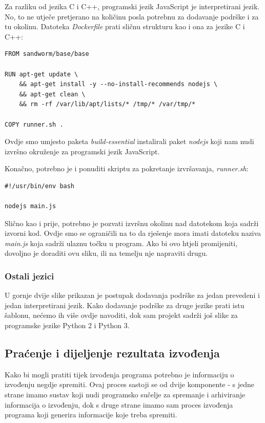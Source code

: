 \documentclass[times, utf8, zavrsni]{fer}
\begin{document}
Za razliku od jezika C i C++, programski jezik JavaScript je interpretirani jezik. No, to ne utječe pretjerano na količinu posla potrebnu za dodavanje podrške i za tu okolinu. Datoteka {\textit{Dockerfile}} prati sličnu strukturu kao i ona za jezike C i C++:

\begin{lstlisting}
FROM sandworm/base/base

RUN apt-get update \
    && apt-get install -y --no-install-recommends nodejs \
    && apt-get clean \
    && rm -rf /var/lib/apt/lists/* /tmp/* /var/tmp/*

COPY runner.sh .
\end{lstlisting}

Ovdje smo umjesto paketa {\textit{build-essential}} instalirali paket {\textit{nodejs}} koji nam nudi izvršno okruženje za programski jezik JavaScript.

Konačno, potrebno je i ponuditi skriptu za pokretanje izvršavanja, {\textit{runner.sh}}:

\begin{lstlisting}
#!/usr/bin/env bash

nodejs main.js
\end{lstlisting}

Slično kao i prije, potrebno je pozvati izvršnu okolinu nad datotekom koja sadrži izvorni kod. Ovdje smo se ograničili na to da rješenje mora imati datoteku naziva {\textit{main.js}} koja sadrži ulaznu točku u program. Ako bi ovo htjeli promijeniti, dovoljno je doraditi ovu sliku, ili na temelju nje napraviti drugu.

\subsubsection{Ostali jezici}

U gornje dvije slike prikazan je postupak dodavanja podrške za jedan prevedeni i jedan interpretirani jezik. Kako dodavanje podrške za druge jezike prati istu šablonu, nećemo ih više ovdje navoditi, dok sam projekt sadrži još slike za programske jezike Python 2 i Python 3.

\subsection{Praćenje i dijeljenje rezultata izvođenja}

Kako bi mogli pratiti tijek izvođenja programa potrebno je informaciju o izvođenju negdje spremiti. Ovaj proces sastoji se od dvije komponente - s jedne strane imamo sustav koji nudi programsko sučelje za spremanje i arhiviranje informacija o izvođenju, dok s druge strane imamo sam proces izvođenja programa koji generira informacije koje treba spremiti.
\end{document}
